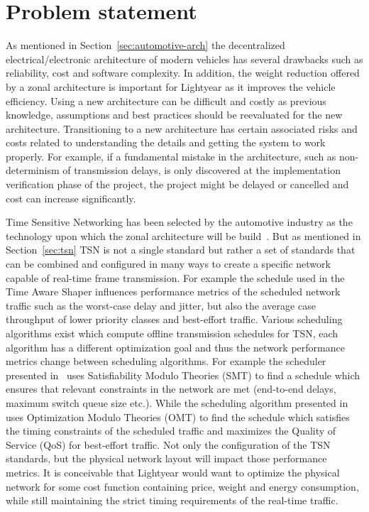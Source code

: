 \section{Problem statement}
As mentioned in Section~\ref{sec:automotive-arch} the decentralized electrical/electronic architecture of modern vehicles has several drawbacks such as reliability, cost and software complexity. In addition, the weight reduction offered by a zonal architecture is important for Lightyear as it improves the vehicle efficiency. Using a new architecture can be difficult and costly as previous knowledge, assumptions and best practices should be reevaluated for the new architecture. Transitioning to a new architecture has certain associated risks and costs related to understanding the details and getting the system to work properly. For example, if a fundamental mistake in the architecture, such as non-determinism of transmission delays, is only discovered at the implementation verification phase of the project, the project might be delayed or cancelled and cost can increase significantly.

Time Sensitive Networking has been selected by the automotive industry as the technology upon which the zonal architecture will be build~\cite{klaus2019zonal}. But as mentioned in Section~\ref{sec:tsn} TSN is not a single standard but rather a set of standards that can be combined and configured in many ways to create a specific network capable of real-time frame transmission. For example the schedule used in the Time Aware Shaper influences performance metrics of the scheduled network traffic such as the worst-case delay and jitter, but also the average case throughput of lower priority classes and best-effort traffic. Various scheduling algorithms exist which compute offline transmission schedules for TSN, each algorithm has a different optimization goal and thus the network performance metrics change between scheduling algorithms. For example the scheduler presented in~\cite{steiner2010evaluation} uses Satisfiability Modulo Theories (SMT) to find a schedule which ensures that relevant constraints in the network are met (end-to-end delays, maximum switch queue size etc.). While the scheduling algorithm presented in~\cite{houtan2021synthesising} uses Optimization Modulo Theories (OMT) to find the schedule which satisfies the timing constraints of the scheduled traffic and maximizes the Quality of Service (QoS) for best-effort traffic. Not only the configuration of the TSN standards, but the physical network layout will impact those performance metrics. It is conceivable that Lightyear would want to optimize the physical network for some cost function containing price, weight and energy consumption, while still maintaining the strict timing requirements of the real-time traffic. 

